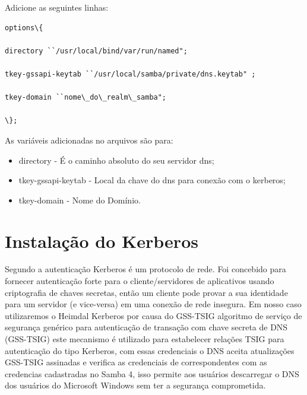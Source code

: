 Adicione as seguintes linhas:

\begin{lstlisting}
options\{ 
	
directory ``/usr/local/bind/var/run/named"; 

tkey-gssapi-keytab ``/usr/local/samba/private/dns.keytab" ; 

tkey-domain ``nome\_do\_realm\_samba";
	
\};
\end{lstlisting}

As variáveis adicionadas no arquivos são para:

\begin{itemize}
	\item{directory} -  É o caminho absoluto do seu servidor dns;
	\item{tkey-gssapi-keytab} - Local da chave do dns para conexão com o kerberos;
	\item{tkey-domain} - Nome do Domínio.
\end{itemize}

\section{Instalação do Kerberos}

Segundo \cite{HEIMDAL} a autenticação Kerberos é um protocolo de rede. Foi concebido para fornecer autenticação forte para o cliente/servidores de aplicativos usando criptografia de chaves secretas, então um cliente pode provar a sua identidade para um servidor (e vice-versa) em uma conexão de rede insegura.
Em nosso caso utilizaremos o Heimdal Kerberos por causa do GSS-TSIG algoritmo de serviço de segurança genérico para autenticação de transação com chave secreta de DNS (GSS-TSIG) este mecanismo é utilizado para estabelecer relações TSIG para autenticação do tipo Kerberos, com essas credenciais o DNS aceita atualizações GSS-TSIG assinadas e verifica as credenciais de correspondentes com as credencias cadastradas no Samba 4, isso permite aos usuários descarregar o DNS dos usuários do Microsoft Windows sem ter a segurança comprometida.

